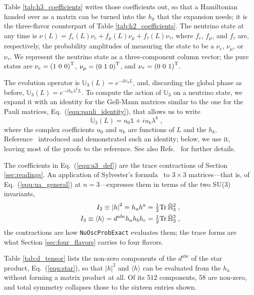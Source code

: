 \documentclass[final,5p,times,twocolumn,sort,compress]{elsarticle}
\newcommand{\eq}{Eq.}
\newcommand{\Refs}{Refs.}
\newcommand{\equ}[1]{\eq~(\ref{equ:#1})}
\begin{document}
Table \ref{tab:h3_coefficients} writes those coefficients out, so that a Hamiltonian handed over as a matrix can be turned into the $h_k$ that the expansion needs; it is the three-flavor counterpart of Table \ref{tab:h2_coefficients}.  The neutrino state at any time is $\nu(L) = f_e(L) \nu_e + f_\mu(L) \nu_\mu + f_\tau(L) \nu_\tau$, where $f_e$, $f_\mu$, and $f_\tau$ are, respectively, the probability amplitudes of measuring the state to be a $\nu_e$, $\nu_\mu$, or $\nu_\tau$.  We represent the neutrino state as a three-component column vector; the pure states are $\nu_e = \left(1~0~0\right)^{\rm T}$, $\nu_\mu=\left(0~1~0\right)^{\rm T}$, and $\nu_\tau=\left(0~0~1\right)^{\rm T}$.

The evolution operator is $\mathbb{U}_3\left(L\right) = e^{-i \mathbb{H}_3 L}$, and, discarding the global phase as before, $\mathbb{U}_3\left(L\right) = e^{-ih_k\lambda^kL}$.  To compute the action of $\mathbb{U}_3$ on a neutrino state, we expand it with an identity for the Gell-Mann matrices similar to the one for the Pauli matrices, \equ{pauli_identity}, that allows us to write
\begin{equation}
 \label{equ:u3_def}
 \mathbb{U}_3\left(L\right)
 =
 u_0 \mathbb{1} + i u_k \lambda^k \;,
\end{equation}
where the complex coefficients $u_0$ and $u_k$ are functions of $L$ and the $h_k$.  Reference\ \cite{MacFarlane:1968vc} introduced and demonstrated such an identity; below, we use it, leaving most of the proofs to the reference.  See also \Refs\ \cite{Lehrer-Ilamed:1964, Rosen:1971nt, Torruella:1975, Kusnezov:1995, Curtright:2015iba, VanKortryk:2015kua} for further details.

The coefficients in \equ{u3_def} are the trace contractions of Section \ref{sec:readings}.  An application of Sylvester's formula\ \cite{Sylvester:1883} to $3 \times 3$ matrices---that is, of \equ{ua_general} at $n = 3$---expresses them in terms of the two SU(3) invariants,
\begin{eqnarray}
 && I_2 \equiv \left\vert h \right\vert^2 = h_a h^a = \tfrac{1}{2}{\rm Tr}\,\tilde{\mathbb{H}}_3^2 \;, \\
 && I_3 \equiv \langle h \rangle = d^{abc}h_ah_bh_c = \tfrac{1}{2}{\rm Tr}\,\tilde{\mathbb{H}}_3^3 \;,
\end{eqnarray}
the contractions are how {\tt NuOscProbExact} evaluates them; the trace forms are what Section \ref{sec:four_flavors} carries to four flavors.

Table \ref{tab:d_tensor} lists the non-zero components of the $d^{abc}$ of the star product, \equ{star}, so that $\lvert h \rvert^2$ and $\langle h \rangle$ can be evaluated from the $h_a$ without forming a matrix product at all.  Of its $512$ components, $58$ are non-zero, and total symmetry collapses those to the sixteen entries shown.
\end{document}
